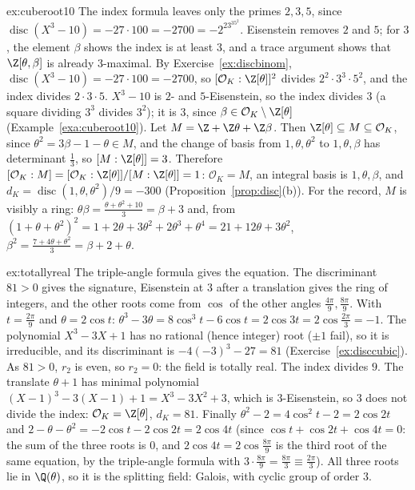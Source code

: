\begin{solution}{ex:cuberoot10}
\idea The index formula leaves only the primes $2,3,5$, since $\operatorname{disc}(X^3-10)=-27\cdot100=-2700=-2^23^35^2$.
Eisenstein removes $2$ and $5$; for $3$, the element $\beta$ shows the index is at least $3$, and a trace argument shows
that $\Z[\theta,\beta]$ is already $3$-maximal.
\writeup By Exercise~\ref{ex:discbinom}, $\operatorname{disc}(X^3-10)=-27\cdot100=-2700$, so $[\mathcal O_K:\Z[\theta]]^2$
divides $2^2\cdot3^3\cdot5^2$, and the index divides $2\cdot3\cdot5$. $X^3-10$ is $2$- and $5$-Eisenstein, so the
index divides $3$ (a square dividing $3^3$ divides $3^2$); it is $3$, since $\beta\in\mathcal O_K\setminus\Z[\theta]$
(Example~\ref{exa:cuberoot10}). Let $M=\Z+\Z\theta+\Z\beta$. Then $\Z[\theta]\subseteq M\subseteq\mathcal O_K$, since
$\theta^2=3\beta-1-\theta\in M$, and the change of basis from $1,\theta,\theta^2$ to $1,\theta,\beta$ has determinant
$\frac13$, so $[M:\Z[\theta]]=3$. Therefore $[\mathcal O_K:M]=[\mathcal O_K:\Z[\theta]]/[M:\Z[\theta]]=1$:
$\mathcal O_K=M$, an integral basis is $1,\theta,\beta$, and $d_K=\operatorname{disc}(1,\theta,\theta^2)/9=-300$
(Proposition~\ref{prop:disc}(b)). For the record, $M$ is visibly a ring: $\theta\beta=\frac{\theta+\theta^2+10}3=\beta+3$
and, from $(1+\theta+\theta^2)^2=1+2\theta+3\theta^2+2\theta^3+\theta^4=21+12\theta+3\theta^2$,
$\beta^2=\frac{7+4\theta+\theta^2}3=\beta+2+\theta$.
\end{solution}

\begin{solution}{ex:totallyreal}
\idea The triple-angle formula gives the equation. The discriminant $81>0$ gives the signature, Eisenstein at $3$ after a
translation gives the ring of integers, and the other roots come from $\cos$ of the other angles $\frac{4\pi}9,\frac{8\pi}9$.
\writeup With $t=\frac{2\pi}9$ and $\theta=2\cos t$: $\theta^3-3\theta=8\cos^3t-6\cos t=2\cos3t=2\cos\frac{2\pi}3=-1$. The
polynomial $X^3-3X+1$ has no rational (hence integer) root ($\pm1$ fail), so it is irreducible, and its discriminant is
$-4(-3)^3-27=81$ (Exercise~\ref{ex:disccubic}). As $81>0$, $r_2$ is even, so $r_2=0$: the field is totally real. The
index divides $9$. The translate $\theta+1$ has minimal polynomial $(X-1)^3-3(X-1)+1=X^3-3X^2+3$, which is
$3$-Eisenstein, so $3$ does not divide the index: $\mathcal O_K=\Z[\theta]$, $d_K=81$. Finally $\theta^2-2=4\cos^2t-2=
2\cos2t$ and $2-\theta-\theta^2=-2\cos t-2\cos2t=2\cos4t$ (since $\cos t+\cos2t+\cos4t=0$: the sum of the three roots is
$0$, and $2\cos4t=2\cos\frac{8\pi}9$ is the third root of the same equation, by the triple-angle formula with $3\cdot
\frac{8\pi}9=\frac{8\pi}3\equiv\frac{2\pi}3$). All three roots lie in $\Q(\theta)$, so it is the splitting field: Galois,
with cyclic group of order $3$.
\end{solution}

